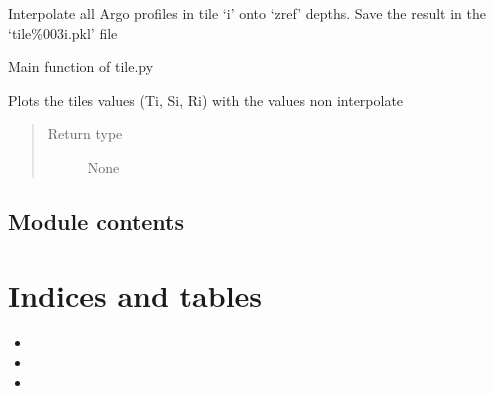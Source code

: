 \documentclass[letterpaper,10pt,english]{sphinxmanual}
\begin{document}

\begin{fulllineitems}
\label{\detokenize{pargopy:pargopy.tile.generate_tile}}
Interpolate all Argo profiles in tile ‘i’ onto ‘zref’ depths. Save
the result in the ‘tile\%003i.pkl’ file

\end{fulllineitems}


\begin{fulllineitems}
\label{\detokenize{pargopy:pargopy.tile.main}}
Main function of tile.py

\end{fulllineitems}


\begin{fulllineitems}
\label{\detokenize{pargopy:pargopy.tile.plot_tile}}
Plots the tiles values (Ti, Si, Ri) with the values non interpolate
\begin{quote}\begin{description}
\item[{Return type}] \leavevmode
None

\end{description}\end{quote}

\end{fulllineitems}



\section{Module contents}
\label{\detokenize{pargopy:module-contents}}\label{\detokenize{pargopy:module-pargopy}}

\chapter{Indices and tables}
\label{\detokenize{index:indices-and-tables}}\begin{itemize}
\item {} 

\item {} 

\item {} 

\end{itemize}
\end{document}
